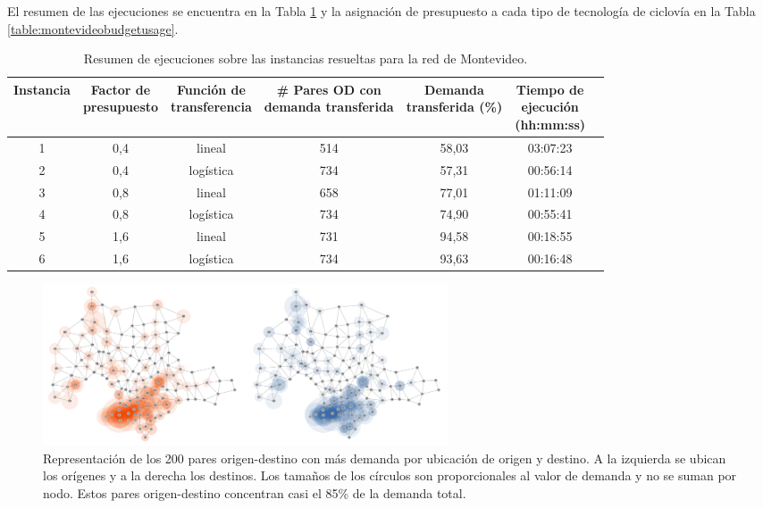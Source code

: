 \documentclass{article}
\begin{document}
  El resumen de las ejecuciones se encuentra en la Tabla \ref{table:montevideoexecutions} y la asignación de presupuesto a cada tipo de tecnología de ciclovía en la Tabla \ref{table:montevideobudgetusage}.

  \begin{table}[h!]
    \centering
    \begin{adjustbox}{width=1.2\textwidth,center=\textwidth}
      \begin{tabular}{ccccccc}
        \toprule
          Instancia & \shortstack{Factor de \\ presupuesto} & \shortstack{Función de \\ transferencia} & \shortstack{\# Pares OD con \\ demanda transferida} & \shortstack{Demanda \\ transferida (\%)} & \shortstack{Tiempo de \\ ejecución \\ (hh:mm:ss)} \\
        \midrule
          1 & 0,4 & lineal    & 514 & 58,03 & 03:07:23 \\
          2 & 0,4 & logística & 734 & 57,31 &  00:56:14 \\
          3 & 0,8 & lineal    & 658 & 77,01 &  01:11:09 \\
          4 & 0,8 & logística & 734 & 74,90 &  00:55:41 \\
          5 & 1,6 & lineal    & 731 & 94,58 &  00:18:55 \\
          6 & 1,6 & logística & 734 & 93,63 &  00:16:48 \\
        \bottomrule
      \end{tabular}
    \end{adjustbox}
    \caption{Resumen de ejecuciones sobre las instancias resueltas para la red de Montevideo.}\label{table:montevideoexecutions}
  \end{table}

  \begin{figure}[h!]
    \centering
    \includegraphics[width=12cm]{../resources/montevideo_demands.png}
      \caption{Representación de los 200 pares origen-destino con más demanda por ubicación de origen y destino. A la izquierda se ubican los orígenes y a la derecha los destinos. Los tamaños de los círculos son proporcionales al valor de demanda y no se suman por nodo. Estos pares origen-destino concentran casi el 85\% de la demanda total.}
    \label{fig:montevideodemanddist}
  \end{figure}
\end{document}
